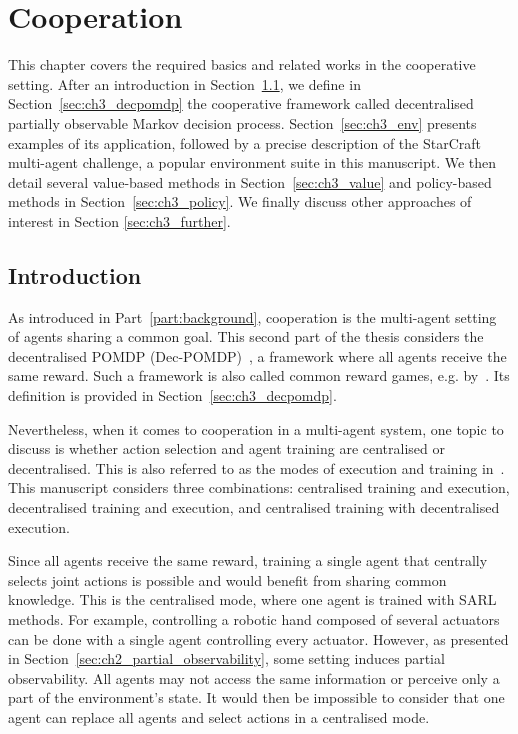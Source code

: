 \chapter{Cooperation}\label{ch:cooperation}
\begin{chapter_outline}

This chapter covers the required basics and related works in the cooperative setting.
After an introduction in Section~\ref{sec:ch3_intro}, we  define in Section~\ref{sec:ch3_decpomdp} the cooperative framework called decentralised partially observable Markov decision process.
Section~\ref{sec:ch3_env} presents examples of its application, followed by a precise description of the StarCraft multi-agent challenge, a popular environment suite in this manuscript.
We then detail several value-based methods in Section~\ref{sec:ch3_value} and policy-based methods in Section~\ref{sec:ch3_policy}.
We finally discuss other approaches of interest in Section \ref{sec:ch3_further}.
\end{chapter_outline}

\section{Introduction}
\label{sec:ch3_intro}
As introduced in Part~\ref{part:background}, cooperation is the multi-agent setting of agents sharing a common goal.
This second part of the thesis considers the decentralised POMDP (Dec-POMDP)~\citep{DecPomdp}, a framework where all agents receive the same reward.
Such a framework is also called common reward games, e.g. by~\cite{marl-book}.
Its definition is provided in Section~\ref{sec:ch3_decpomdp}.

Nevertheless, when it comes to cooperation in a multi-agent system, one topic to discuss is whether action selection and agent training are centralised or decentralised.
This is also referred to as the modes of execution and training in~\citep{marl-book}.
This manuscript considers three combinations: centralised training and execution, decentralised training and execution, and centralised training with decentralised execution.

Since all agents receive the same reward, training a single agent that centrally selects joint actions is possible and would benefit from sharing common knowledge.
This is the centralised mode, where one agent is trained with SARL methods.
For example, controlling a robotic hand composed of several actuators can be done with a single agent controlling every actuator.
However, as presented in Section~\ref{sec:ch2_partial_observability}, some setting induces partial observability.
All agents may not access the same information or perceive only a part of the environment's state.
It would then be impossible to consider that one agent can replace all agents and select actions in a centralised mode.

